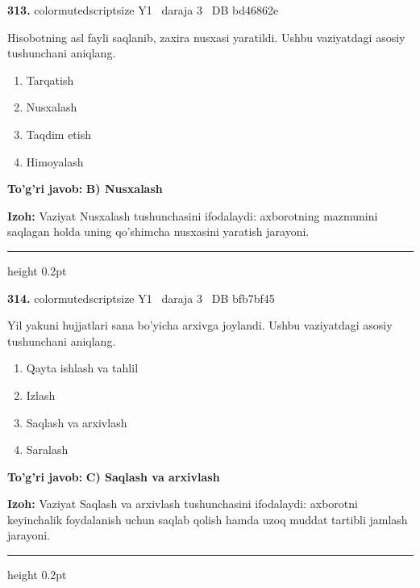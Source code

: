 \documentclass[10pt,a4paper,oneside]{article}
\begin{document}
\noindent\textbf{\color{ink}313.}  {color{muted}scriptsize Y1 \textbullet\ daraja 3 \textbullet\ DB bd46862e}
\par
Hisobotning asl fayli saqlanib, zaxira nusxasi yaratildi. Ushbu vaziyatdagi asosiy tushunchani aniqlang.
\begin{enumerate}[label=\Alph*),leftmargin=9mm]
\item Tarqatish
\item Nusxalash
\item Taqdim etish
\item Himoyalash
\end{enumerate}
\begin{tcolorbox}[enhanced,breakable,colback=teal!4,colframe=teal!50!black,boxrule=0.5pt,arc=1.1mm,left=3mm,right=3mm,top=1.7mm,bottom=1.7mm,before skip=2mm,after skip=2mm]
\textbf{\color{teal}To'g'ri javob:} \textbf{B) Nusxalash}
\par\smallskip
\textbf{Izoh:} Vaziyat Nusxalash tushunchasini ifodalaydi: axborotning mazmunini saqlagan holda uning qo'shimcha nusxasini yaratish jarayoni.
\end{tcolorbox}
\vspace{2mm}\hrule height 0.2pt \vspace{3mm}

\noindent\textbf{\color{ink}314.}  {color{muted}scriptsize Y1 \textbullet\ daraja 3 \textbullet\ DB bfb7bf45}
\par
Yil yakuni hujjatlari sana bo'yicha arxivga joylandi. Ushbu vaziyatdagi asosiy tushunchani aniqlang.
\begin{enumerate}[label=\Alph*),leftmargin=9mm]
\item Qayta ishlash va tahlil
\item Izlash
\item Saqlash va arxivlash
\item Saralash
\end{enumerate}
\begin{tcolorbox}[enhanced,breakable,colback=teal!4,colframe=teal!50!black,boxrule=0.5pt,arc=1.1mm,left=3mm,right=3mm,top=1.7mm,bottom=1.7mm,before skip=2mm,after skip=2mm]
\textbf{\color{teal}To'g'ri javob:} \textbf{C) Saqlash va arxivlash}
\par\smallskip
\textbf{Izoh:} Vaziyat Saqlash va arxivlash tushunchasini ifodalaydi: axborotni keyinchalik foydalanish uchun saqlab qolish hamda uzoq muddat tartibli jamlash jarayoni.
\end{tcolorbox}
\vspace{2mm}\hrule height 0.2pt \vspace{3mm}
\end{document}
